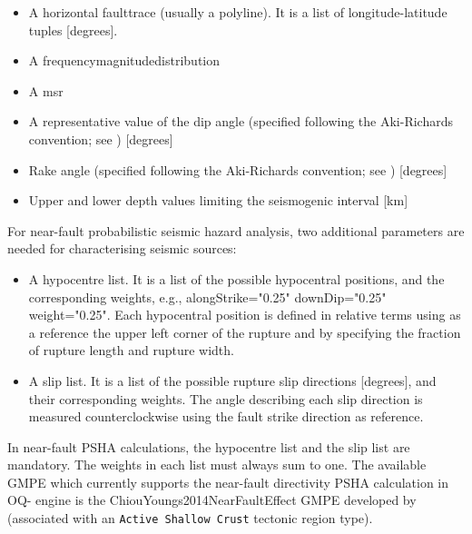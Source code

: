 \begin{itemize}

    \item A horizontal \gls{faulttrace} (usually a polyline). It is a list of
    longitude-latitude tuples [degrees].

    \item A \gls{frequencymagnitudedistribution}

    \item A \gls{msr}

    \item A representative value of the dip angle (specified following
    the Aki-Richards convention; see \citet{aki2002}) [degrees]

    \item Rake angle (specified following the Aki-Richards convention;
    see \citet{aki2002}) [degrees]

    \item Upper and lower depth values limiting the seismogenic interval [km]

\end{itemize}

For near-fault probabilistic seismic hazard analysis, two additional
parameters are needed for characterising seismic sources:

\begin{itemize}

    \item A hypocentre list. It is a list of the possible hypocentral
    positions, and the corresponding weights, e.g., alongStrike="0.25"
    downDip="0.25" weight="0.25". Each hypocentral position is defined in
    relative terms using as a reference the upper left corner of the rupture
    and by specifying the fraction of rupture length and rupture width.

    \item A slip list. It is a list of the possible rupture slip directions
    [degrees], and their corresponding weights. The angle describing each slip
    direction is measured counterclockwise using the fault strike direction as
    reference.

\end{itemize}

In near-fault PSHA calculations, the hypocentre list and the slip list are
mandatory. The weights in each list must always sum to one. The available GMPE
which currently supports the near-fault directivity PSHA calculation in OQ-
engine is the ChiouYoungs2014NearFaultEffect GMPE developed  by
\citet{chiou2014update} (associated with an \texttt{Active Shallow Crust}
tectonic region type).

